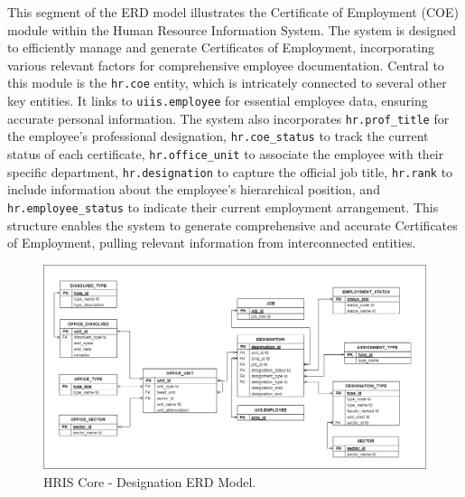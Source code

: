     This segment of the ERD model illustrates the Certificate of Employment (COE) module within the Human Resource Information System. The system is designed to efficiently manage and generate Certificates of Employment, incorporating various relevant factors for comprehensive employee documentation. Central to this module is the \texttt{hr.coe} entity, which is intricately connected to several other key entities. It links to \texttt{uiis.employee} for essential employee data, ensuring accurate personal information. The system also incorporates \texttt{hr.prof\_title} for the employee's professional designation, \texttt{hr.coe\_status} to track the current status of each certificate, \texttt{hr.office\_unit} to associate the employee with their specific department, \texttt{hr.designation} to capture the official job title, \texttt{hr.rank} to include information about the employee's hierarchical position, and \texttt{hr.employee\_status} to indicate their current employment arrangement. This structure enables the system to generate comprehensive and accurate Certificates of Employment, pulling relevant information from interconnected entities.

    \begin{figure}[H]
        \centering
        \includegraphics[width=1\linewidth]{figures/images/diagrams/erd/erd-core-office.png}
        \caption{HRIS Core - Designation ERD Model.}
        \label{fig:erd-core-office}
    \end{figure}


